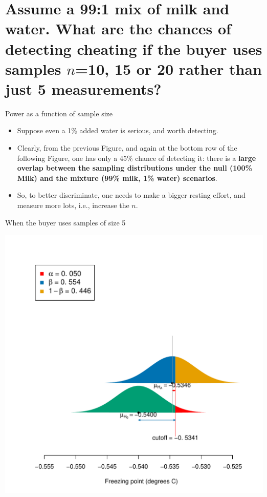 \documentclass[10pt]{beamer}\usepackage[]{graphicx}\usepackage[]{color}
\makeatletter
\def\maxwidth{ %
  \ifdim\Gin@nat@width>\linewidth
    \linewidth
  \else
    \Gin@nat@width
  \fi
}
\newenvironment{knitrout}{}{} %
\makeatother
\begin{document}
\section{Assume a 99:1 mix of milk and water. What are the chances of detecting cheating if the buyer uses samples $n$=10, 15 or 20 rather than just 5 measurements?}

\begin{frame}{Power as a function of sample size}
	
	\begin{itemize}
		\setlength\itemsep{1em}
		\item Suppose even a 1\% added water is serious, and worth detecting.
		\item Clearly, from the previous Figure, and again at the bottom row of the following Figure,
		one has only a 45\% chance of detecting it: there is a \textbf{large overlap between the sampling distributions under the null (100\% Milk) and the mixture (99\% milk, 1\% water) scenarios}. \pause 
		
		\item So, to better discriminate, one needs to make a bigger resting effort, and measure more lots,
		i.e., increase the $n$.
	\end{itemize}
\end{frame}


\begin{frame}[fragile]{When the buyer uses samples of size 5}

	
	
\begin{knitrout}\tiny
{}\color{fgcolor}

{\centering \includegraphics[width=\maxwidth]{figure/unnamed-chunk-12-1} 

}


\end{knitrout}
\end{frame}
\end{document}
